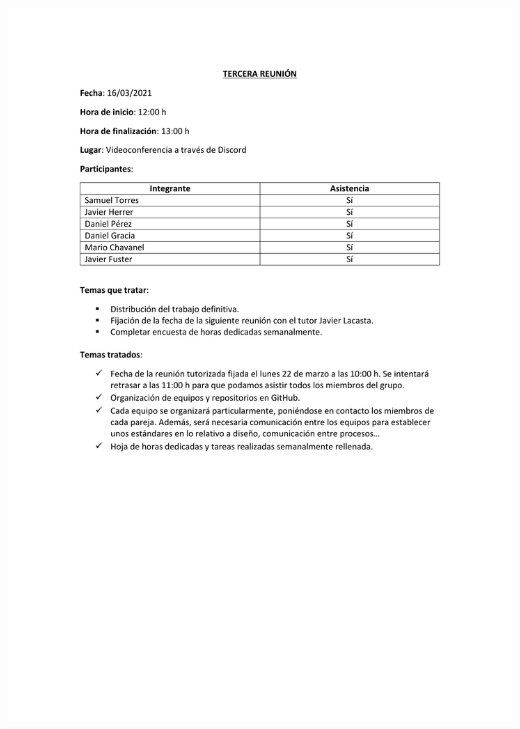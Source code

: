 \documentclass{article}
\begin{document}
\includegraphics[width=\textwidth]{../images/actas/Acta_reunion_3.pdf}
\end{document}
